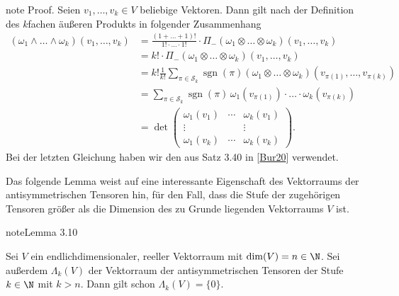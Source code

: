 \documentclass[letterpaper,10pt,german]{jupyterBook}
\begin{document}
\begin{sphinxadmonition}{note}
\sphinxAtStartPar
Proof. Seien \(v_1,\ldots,v_k \in V\) beliebige Vektoren.
Dann gilt nach der Definition des \(k\)\sphinxhyphen{}fachen äußeren Produkts in {\hyperref[\detokenize{vektoranalysis/tensor:equation-eq-kfachesprodukt}]{}} folgender Zusammenhang
\begin{equation*}
\begin{split}(\omega_1 \wedge \ldots \wedge \omega_k)(v_1, \ldots, v_k) &= \frac{(1+\ldots+1)!}{1!\cdot\ldots\cdot1!} \cdot \Pi_-(\omega_1 \otimes \ldots \otimes \omega_k)(v_1,\ldots,v_k) \\
&= k! \cdot \Pi_-(\omega_1 \otimes \ldots \otimes \omega_k)(v_1,\ldots,v_k) \\
&= k! \frac{1}{k!} \sum_{\pi\in \mathcal{S}_k}\operatorname{sgn}(\pi) (\omega_1 \otimes \ldots \otimes \omega_k)(v_{\pi(1)},\ldots,v_{\pi(k)}) \\
&= \sum_{\pi\in \mathcal{S}_k}\operatorname{sgn}(\pi) \, \omega_1(v_{\pi(1)})\cdot \ldots \cdot \omega_k(v_{\pi(k)}) \\
&= \operatorname{det}
\begin{pmatrix}
\omega_1(v_1) & \cdots & \omega_k(v_1)\\
\vdots & & \vdots \\
\omega_1(v_k) & \cdots & \omega_k(v_k)
\end{pmatrix}.\end{split}
\end{equation*}
\sphinxAtStartPar
Bei der letzten Gleichung haben wir den  aus Satz 3.40 in {[}\hyperlink{cite.references:id2}{Bur20}{]} verwendet.
\end{sphinxadmonition}

\sphinxAtStartPar
Das folgende Lemma weist auf eine interessante Eigenschaft des Vektorraums der antisymmetrischen Tensoren hin, für den Fall, dass die Stufe der zugehörigen Tensoren größer als die Dimension des zu Grunde liegenden Vektorraums \(V\) ist.
\label{vektoranalysis/tensor:lem:tensorStufe}
\begin{sphinxadmonition}{note}{Lemma 3.10}



\sphinxAtStartPar
Sei \(V\) ein endlich\sphinxhyphen{}dimensionaler, reeller Vektorraum mit \(\operatorname{dim}(V) = n \in \N\).
Sei außerdem \(\Lambda_k(V)\) der Vektorraum der antisymmetrischen Tensoren der Stufe \(k\in\N\) mit \(k > n\).
Dann gilt schon \(\Lambda_k(V) = \lbrace 0 \rbrace\).
\end{sphinxadmonition}
\end{document}
